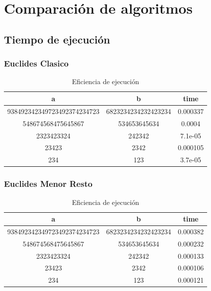 \chapter{Comparaci\'on de algoritmos}

\section{Tiempo de ejecuci\'on}
\subsection{Euclides Clasico}
\begin{table}[H]
\label{tablax}
\begin{center}
\begin{tabular}{|c|c|c|}
\hline 
a&b&time \\
\hline
938492342349723492374234723&6823234234232423234&0.000337\\\hline
548674568475645867&534653645634&0.0004\\\hline
2323423324&242342&7.1e-05\\\hline
23423&2342&0.000105\\\hline
234&123&3.7e-05\\\hline
\end{tabular}
\end{center}
\caption{Eficiencia de ejecuci\'on}
\end{table}
\subsection{Euclides Menor Resto}
\begin{table}[H]
\label{tablax}
\begin{center}
\begin{tabular}{|c|c|c|}
\hline 
a&b&time \\
\hline
938492342349723492374234723&6823234234232423234&0.000382\\\hline
548674568475645867&534653645634&0.000232\\\hline
2323423324&242342&0.000133\\\hline
23423&2342&0.000106\\\hline
234&123&0.000121\\\hline
\end{tabular}
\end{center}
\caption{Eficiencia de ejecuci\'on}
\end{table}

